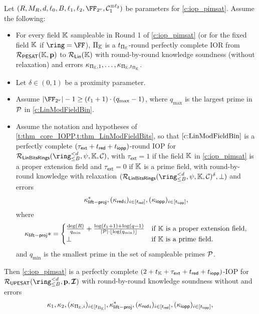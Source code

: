 \documentclass[11pt,letterpaper,usenames,dvipsnames]{article}
\begin{document}
\begin{theorem} \label{t:thm_iop_pimsat}  Let $(R,M_R, \moduledegree, \codedim_0, B, \codedim_1, \codedim_2, \comfield, \cC_1^{\equiv \codedim_2})$ be parameters for \cref{c:iop_pimsat}. Assume the following:
\begin{itemize}
\item For every field $\mathbb{K}$ sampleable in Round 1 of \cref{c:iop_pimsat} (or for the fixed field $\mathbb{K}$ if $\ring = \FF$), $\Pi_{\mathbb{K}}$ is a $t_{\Pi_{\mathbb{K}}}$-round perfectly complete IOR from $\mathcal{R}_{\mathsf{PESAT}}(\mathbb{K}, \mathbf{p})$ to $\mathcal{R}_{\mathsf{Lin}}(\mathbb{K})$ with round-by-round knowledge soundness (without relaxation) and errors $\kappa_{\Pi_{\mathbb{K}}, 1}, \ldots, \kappa_{\Pi_{\mathbb{K}}, t_{\Pi_{\mathbb{K}}}}$. 
\item Let $\delta\in (0,1)$ be a proximity parameter.
\item Assume $|\comfield|-1 \geq (\codedim_1+1)\cdot (q_{\max} -1)$, where $q_{\max}$ is the largest prime in $\mathcal{P}$ in \cref{c:LinModFieldBin}.
\item Assume the notation and hypotheses of \cref{t:thm_core_IOPP,t:thm_LinModFieldBits}, so that  $\cref{c:LinModFieldBin}$ is a perfectly complete $(\tau_{\mathsf{ext}}+t_{\mathsf{red}} +t_{\mathsf{iopp}})$-round IOP for $\LinModFieldBin(\ringtwobounds{B}{\moduledegree},\psi,\KK, \cC)$, with $\tau_{\mathsf{ext}}=1$ if the field $\mathbb{K}$ in \cref{c:iop_pimsat} is a proper extension field and $\tau_{\mathsf{ext}}=0$ if $\mathbb{K}$ is a prime field, with round-by-round knowledge with relaxation $(\LinModFieldBin(\ringtwobounds{B}{\moduledegree},\psi,\KK, \cC)^\delta,\bot)$ and errors $$\kappa_{\mathsf{lift-proj}}^*, ({\kappa_{\mathsf{red}}}_i)_{i\in [t_{\mathsf{red}}]}, ({\kappa_{\mathsf{iopp}}})_{i\in [t_{\mathsf{iopp}}]},$$ where
    $$
    \kappa_{\mathsf{lift-proj}}* = \begin{cases}\frac{\deg(R)}{q_{\min}} + \frac{\log(\ell_1 +1) + \log(q-1)}{|\mathcal{P}|\cdot \lfloor\log(q_{\min})\rfloor} & \text{if } \mathbb{K} \text{ is a proper extension field,}\\
    \bot & \text{if } \mathbb{K} \text{ is a prime field.}
    \end{cases}
    $$
    and $q_{\min}$ is the smallest prime in the set of sampleable primes $\mathcal{P}$. 
\end{itemize}
    Then \cref{c:iop_pimsat} is a perfectly complete $(2+t_{\mathbb{K}} + \tau_{\mathsf{ext}} + t_{\mathsf{red}} +t_{\mathsf{iopp}})$-IOP for $\PIMSAT(\ringtwobounds{B}{\moduledegree},\pp,\bm{\ideal})$ with round-by-round knowledge soundness without  and errors 
    $$
    \kappa_1, \kappa_2, (\kappa_{\Pi_{\mathbb{K}},i})_{i\in [t_{\Pi_{\mathbb{K}}}]}, \kappa_{\mathsf{lift-proj}}^*, ({\kappa_{\mathsf{red}}}_i)_{i\in [t_{\mathsf{red}}]}, ({\kappa_{\mathsf{iopp}}})_{i\in [t_{\mathsf{iopp}}]}, 
$$
\end{theorem}
\end{document}

